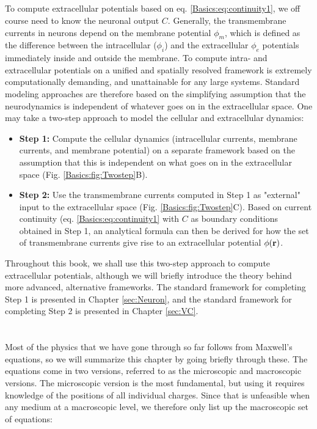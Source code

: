 \subsection{}
To compute extracellular potentials based on eq. \ref{Basics:eq:continuity1}, we off course need to know the neuronal output $C$. Generally, the transmembrane currents in neurons depend on the membrane potential $\phi_m$, which is defined as the difference between the intracellular ($\phi_i$) and the extracellular $\phi_e$ potentials immediately inside and outside the membrane. To compute intra- and extracellular potentials on a unified and spatially resolved framework is extremely computationally demanding, and unattainable for any large systems. Standard modeling approaches are therefore based on the simplifying assumption that the neurodynamics is independent of whatever goes on in the extracellular space. One may take a two-step approach to model the cellular and extracellular dynamics: 

\begin{itemize}
\item {\bf Step 1:} Compute the cellular dynamics (intracellular currents, membrane currents, and membrane potential) on a separate framework based on the assumption that this is independent on what goes on in the extracellular space (Fig. \ref{Basics:fig:Twostep}B). 

\item {\bf Step 2:} Use the transmembrane currents computed in Step 1 as "external" input to the extracellular space (Fig. \ref{Basics:fig:Twostep}C). Based on current continuity (eq. \ref{Basics:eq:continuity1} with $C$ as boundary conditions obtained in Step 1, an analytical formula can then be derived for how the set of transmembrane currents give rise to an extracellular potential $\phi({\bf r})$. 
\end{itemize}

Throughout this book, we shall use this two-step approach to compute extracellular potentials, although we will briefly introduce the theory behind more advanced, alternative frameworks. The standard framework for completing Step 1 is presented in Chapter \ref{sec:Neuron}, and the standard framework for completing Step 2 is presented in Chapter \ref{sec:VC}. 



\section{}
\label{sec:Basics:Maxwell} 
Most of the physics that we have gone through so far follows from Maxwell's equations, so we will summarize this chapter by going briefly through these. The equations come in two versions, referred to as the microscopic and macroscopic versions. The microscopic version is the most fundamental, but using it requires knowledge of the positions of all individual charges. Since that is unfeasible when any medium at a macroscopic level, we therefore only list up the macroscopic set of equations: 

